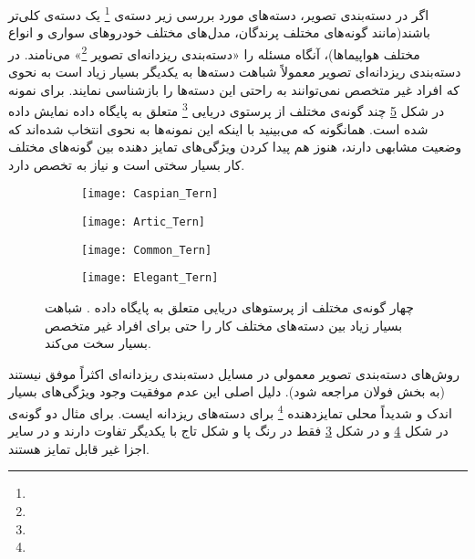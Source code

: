\documentclass[11pt]{article}
\begin{document}
اگر در دسته‌بندی تصویر، دسته‌های مورد بررسی زیر دسته‌ی
\footnote{}
یک دسته‌ی کلی‌تر باشند(مانند گونه‌های مختلف پرندگان، مدل‌های مختلف خودروهای سواری و انواع مختلف هواپیماها)، آنگاه مسئله را «دسته‌بندی ریزدانه‌ای تصویر
\footnote{}»
می‌نامند. در دسته‌بندی ریزدانه‌ای تصویر معمولاً شباهت دسته‌ها به یکدیگر بسیار زیاد است به نحوی که افراد غیر متخصص نمی‌توانند به راحتی این دسته‌ها را بازشناسی نمایند. برای نمونه در شکل
\ref{fig:intro:terns}
چند گونه‌ی مختلف از پرستوی دریایی
\footnote{}
متعلق به پایگاه داده
 \cite{cub2002011}
نمایش داده شده است. همانگونه که می‌بینید با اینکه این نمونه‌ها به نحوی انتخاب شده‌اند که وضعیت مشابهی دارند، هنوز هم پیدا کردن ویژگی‌های تمایز دهنده بین گونه‌های مختلف کار بسیار سختی است و نیاز به تخصص دارد.

\begin{figure}[h]
	\centering
	\begin{subfigure}[h]{0.23\textwidth}
		\texttt{[image: Caspian\_Tern]}
		\caption{}
		\label{fig:intro:terns:1}
	\end{subfigure} 
	\begin{subfigure}[h]{0.23\textwidth}
		\texttt{[image: Artic\_Tern]}
		\caption{}
		\label{fig:intro:terns:2}
	\end{subfigure}
	\begin{subfigure}[h]{0.23\textwidth}
		\texttt{[image: Common\_Tern]}
		\caption{}
		\label{fig:intro:terns:3}
	\end{subfigure}
	\begin{subfigure}[h]{0.23\textwidth}
		\texttt{[image: Elegant\_Tern]}
		\caption{}
		\label{fig:intro:terns:4}
	\end{subfigure}
	\caption{چهار گونه‌ی مختلف از پرستوهای دریایی متعلق به پایگاه داده
 \cite{cub2002011}.
شباهت بسیار زیاد بین دسته‌های مختلف کار را حتی برای افراد غیر متخصص بسیار سخت می‌کند.
}
	\label{fig:intro:terns}
\end{figure}

روش‌های دسته‌بندی تصویر معمولی در مسايل دسته‌بندی ریزدانه‌ای اکثراً موفق نیستند (به بخش فولان مراجعه شود). دلیل اصلی این عدم موفقیت وجود ویژگی‌های بسیار اندک و شدیداً محلی تمایزدهنده
\footnote{}
برای دسته‌های ریزدانه ایست. برای مثال دو گونه‌ی
 در شکل \ref{fig:intro:terns:4}
و
 در شکل \ref{fig:intro:terns:3}
فقط در رنگ پا و شکل تاج با یکدیگر تفاوت دارند و در سایر اجزا غیر قابل تمایز هستند. 
\end{document}
